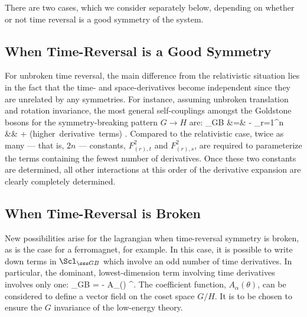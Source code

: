 \documentclass[12pt,epsf]{report}
\begin{document}
There are two cases, which we consider separately below,
depending on whether or not time reversal is a good 
symmetry of the system. 

\subsection{When Time-Reversal is a Good Symmetry}

For unbroken time reversal, the main difference from the
relativistic situation lies in the fact that the time- and
space-derivatives become independent since they are
unrelated by any symmetries. For instance, assuming
unbroken translation and rotation invariance, the most
general self-couplings amongst the Goldstone bosons for the
symmetry-breaking pattern $G \to H$ are:
%
\bg
\label{genlowdtermnr}
\Scl_{\sss GB} &=& - \hf \sum_{r=1}^n  \nn\\ && \qquad \qquad 
\qquad + \hbox{(higher
derivative terms)} .
\nd
%
Compared to the relativistic case, twice as many --- that
is, $2n$ --- constants, $F_{(r),t}^2$ and $F_{(r),s}^2$,
are required to parameterize the terms containing the
fewest number of derivatives. Once these two constants are
determined, all other interactions at this order of the
derivative expansion are clearly completely determined.

\subsection{When Time-Reversal is Broken}

New possibilities arise for the lagrangian when
time-reversal symmetry is broken, as is the case for a
ferromagnet, for example. In this case, it is possible to
write down terms in $\Scl_{\sss GB}$ which involve an odd
number of time derivatives. In particular, the dominant,
lowest-dimension term involving time derivatives involves
only one:
%
\eq
\label{tvterm}
\Delta \Scl_{\sss GB} = - A_\alpha(\theta) \; \dot
\theta^\alpha.
\eeq
%
The coefficient function, $A_\alpha(\theta)$, can be
considered to define a vector field on the coset space
$G/H$. It is to be chosen to ensure the $G$ invariance of
the low-energy theory.
\end{document}
